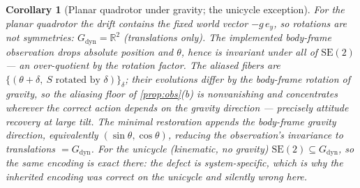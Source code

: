 \documentclass[11pt]{article}
\theoremstyle{plain}
\newtheorem{corollary}[theorem]{Corollary}
\theoremstyle{definition}
\theoremstyle{remark}
\newcommand{\R}{\mathbb{R}}
\begin{document}
\begin{corollary}[Planar quadrotor under gravity; the unicycle exception]\label{cor:obs-quad}
For the planar quadrotor the drift contains the fixed world vector $-g\,e_y$, so rotations are
not symmetries: $G_{\mathrm{dyn}}=\R^2$ (translations only). The implemented body-frame
observation drops absolute position \emph{and} $\theta$, hence is invariant under all of
$\mathrm{SE}(2)$ --- an over-quotient by the rotation factor. The aliased fibers are
$\{(\theta+\delta,\ S\text{ rotated by }\delta)\}_\delta$; their evolutions differ by the
body-frame rotation of gravity, so the aliasing floor of \cref{prop:obs}(b) is nonvanishing and
concentrates wherever the correct action depends on the gravity direction --- precisely
attitude recovery at large tilt. The \emph{minimal restoration} appends the body-frame gravity
direction, equivalently $(\sin\theta,\cos\theta)$, reducing the observation's invariance to
translations $=G_{\mathrm{dyn}}$. For the unicycle (kinematic, no gravity)
$\mathrm{SE}(2)\subseteq G_{\mathrm{dyn}}$, so the same encoding is exact there: the defect is
system-specific, which is why the inherited encoding was correct on the unicycle and silently
wrong here.
\end{corollary}
\end{document}
